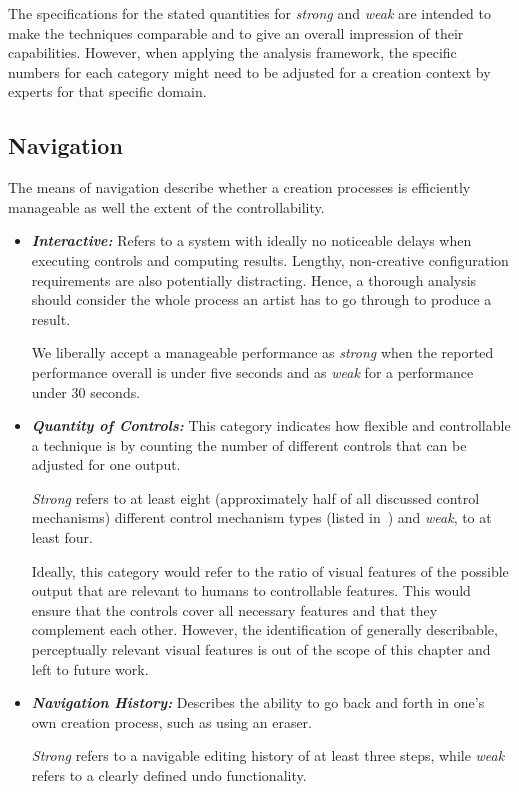 The specifications for the stated quantities for \textit{strong} and \textit{weak} are intended to make the techniques comparable and to give an overall impression of their capabilities. However, when applying the analysis framework, the specific numbers for each category might need to be adjusted for a creation context by experts for that specific domain. 


\subsection{Navigation}
\label{subsec:taxo_navigation}

The means of navigation describe whether a creation processes is efficiently manageable as well the extent of the controllability.

\begin{itemize}
    \item \textit{\textbf{Interactive:}} Refers to a system with ideally no noticeable delays when executing controls and computing results. Lengthy, non-creative configuration requirements are also potentially distracting. Hence, a thorough analysis should consider the whole process an artist has to go through to produce a result.

    We liberally accept a manageable performance as \textit{strong} when the reported performance overall is under five seconds and as \textit{weak} for a performance under 30 seconds. 

    \item \textit{\textbf{Quantity of Controls:}} This category indicates how flexible and controllable a technique is by counting the number of different controls that can be adjusted for one output. 

    \textit{Strong} refers to at least eight (approximately half of all discussed control mechanisms) different control mechanism types (listed in~) and \textit{weak}, to at least four.
    
    Ideally, this category would refer to the ratio of visual features of the possible output that are relevant to humans to controllable features. This would ensure that the controls cover all necessary features and that they complement each other. However, the identification of generally describable, perceptually relevant visual features is out of the scope of this chapter and left to future work.

    \item \textit{\textbf{Navigation History:}} Describes the ability to go back and forth in one's own creation process, such as using an eraser.

    \textit{Strong} refers to a navigable editing history of at least three steps, while \textit{weak} refers to a clearly defined undo functionality.
\end{itemize}




